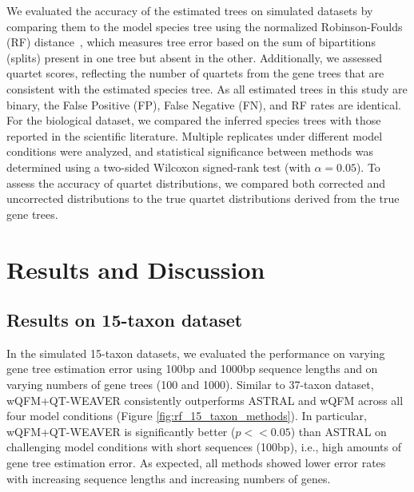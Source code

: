 \documentclass[10pt,a4paper]{article}
\begin{document}
We evaluated the accuracy of the estimated trees on simulated datasets by comparing them to the model species tree using the normalized Robinson-Foulds (RF) distance~\cite{robinson_comparison_1981}, which measures tree error based on the sum of bipartitions (splits) present in one tree but absent in the other. Additionally, we assessed quartet scores, reflecting the number of quartets from the gene trees that are consistent with the estimated species tree. As all estimated trees in this study are binary, the False Positive (FP), False Negative (FN), and RF rates are identical. For the biological dataset, we compared the inferred species trees with those reported in the scientific literature. Multiple replicates under different model conditions were analyzed, and statistical significance between methods was determined using a two-sided Wilcoxon signed-rank test (with $\alpha = 0.05$). To assess the accuracy of quartet distributions, we compared both corrected and uncorrected distributions to the true quartet distributions derived from the true gene trees.


\section{Results and Discussion}
  
\subsection{Results on 15-taxon dataset}

In the simulated 15-taxon datasets, we evaluated the performance on varying gene tree estimation error using 100bp and 1000bp sequence lengths and on varying numbers of gene trees (100 and 1000). Similar to 37-taxon dataset, wQFM+QT-WEAVER consistently outperforms ASTRAL and wQFM across all four model conditions (Figure \ref{fig:rf_15_taxon_methods}). In particular, wQFM+QT-WEAVER is significantly better ($p<<0.05$) than ASTRAL on challenging model conditions with short sequences (100bp), i.e., high amounts of gene tree estimation error. As expected, all methods showed lower error rates with increasing sequence lengths and increasing numbers of genes. 
\end{document}
